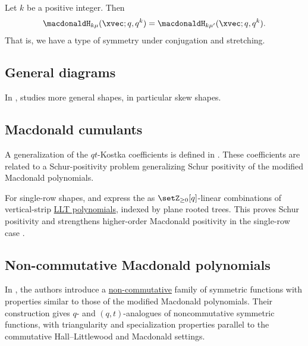 \begin{proposition}
Let $k$ be a positive integer. Then
\[
\macdonaldH_{k \mu}(\xvec;q,q^k) = \macdonaldH_{k \mu'}(\xvec;q,q^k).
\]
That is, we have a type of symmetry under conjugation and stretching.
\end{proposition}



\subsection[macdonaldHSkew]{General diagrams}

In \cite{Bandlow2007},  studies more general shapes, in
particular skew shapes.


\subsection[macdonaldHCumulants]{Macdonald cumulants}

A generalization of the $qt$-Kostka coefficients is defined in
\cite{Dolega2019}.  These coefficients are related to a Schur-positivity
problem generalizing Schur positivity of the modified Macdonald polynomials.

For single-row shapes,  and  express the
\label{singleRowMacdonaldCumulantLLTPositivity} as
$\setZ_{\geq 0}[q]$-linear combinations of vertical-strip
\hyperref[lltPolynomialDefinition]{LLT polynomials}, indexed by plane rooted
trees.  This proves Schur positivity and strengthens higher-order Macdonald
positivity in the single-row case
\cite[Thm.~1.3 and Cor.~1.4]{HaglundTewari2026x}.


\subsection[macdonaldHNonCommutative]{Non-commutative Macdonald polynomials}

In \cite{BergeronZabrocki2005}, the authors introduce a
\hyperref[nonComFunctions]{non-commutative} family of symmetric functions
with properties similar to those of the modified Macdonald polynomials.
Their construction gives $q$- and $(q,t)$-analogues of noncommutative
symmetric functions, with triangularity and specialization properties
parallel to the commutative Hall--Littlewood and Macdonald settings.
